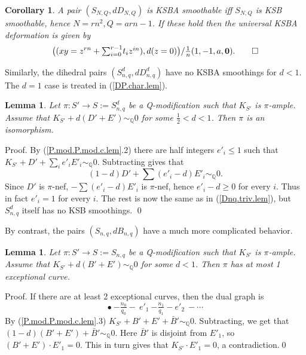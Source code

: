 \documentclass{amsart}
\newtheorem{lem}[thm]{Lemma}
\newtheorem{cor}[thm]{Corollary}
\theoremstyle{definition}
\theoremstyle{remark}
\newcommand{\q}[0]{{\mathbb Q}}
\newcommand{\simq}[0]{\sim_{\q}}
\newcommand{\tsum}[0]{\textstyle{\sum}}
\begin{document}
\begin{cor} \label{34.1.no.defs.thm} A pair 
  $(S_{N,Q}, dD_{N,Q})$ is KSBA smoothable iff $S_{N,Q}$ is KSB smoothable, hence
  $N=rn^2, Q=arn-1$. If these hold then
  the universal KSBA deformation is given by
  $$
  \bigl((xy=z^{rn}+\tsum_{i=0}^{r-1}t_iz^{in}), d(z=0)\bigr)/\tfrac1{n}(1, -1, a, {\mathbf 0}).
  \hfill\qed
  $$
\end{cor}


Similarly, the dihedral pairs $(S^d_{n,q}, dD^d_{n,q})$ have no KSBA smoothings for $d<1$.  The $d=1$ case is treated in (\ref{DP.char.lem}). 

    \begin{lem} \label{Cdnq.triv.lem} Let $\pi:S'\to S:=S^d_{n,q}$ be a Q-modification such that
     $K_{S'}$ is $\pi$-ample. Assume that $K_{S'}+d(D'+E')\simq 0$ for some
     $\frac12< d<1$. Then $\pi$ is an isomorphism.
\end{lem}

     Proof.   By (\ref{P.mod.P.mod.c.lem}.2) there are half integers
     $e'_i\leq 1$ such that  $K_{S'}+D'+\sum_i e'_iE'_i\simq 0$.
     Subtracting gives that
     $$
     (1-d)D'+\tsum (e'_i-d)E'_i\simq 0.
     $$
     Since  $D'$ is $\pi$-nef, $-\tsum (e'_i-d)E'_i$ is $\pi$-nef,
     hence $e'_i-d\geq 0$ for every $i$.   Thus in fact $e'_i=1$ for every $i$.
     The rest is now the same as in (\ref{Dnq.triv.lem}), but $S^d_{n,q}$ itself has no KSB smoothings. \qed






\medskip
By contrast, the pairs  $(S_{n,q}, dB_{n,q})$ have a much more complicated behavior.
   
   \begin{lem} \label{Bnq.almosttriv.lem} Let $\pi:S'\to S:=S_{n,q}$ be a Q-modification such that
     $K_{S'}$ is $\pi$-ample. Assume that $K_{S'}+d(B'+E')\simq 0$ for some
     $ d<1$. Then $\pi$ has at most 1 exceptional curve.
\end{lem}

   Proof.  If there are at least 2 exceptional curves, then 
   the dual graph  is
$$
   \bullet \ {-\boxed{\tfrac{n_0}{q_0}}-} \  e'_1 \  {-\boxed{\tfrac{n_1}{q_1}}-} e'_2 \ - \cdots
   $$
   By (\ref{P.mod.P.mod.c.lem}.3)  $K_{S'}+B'+E'+\bar B'\simq 0$.
   Subtracting, we get that
   $(1-d)(B'+E')+\bar B'\simq 0$.
   Here $\bar B'$ is disjoint from $E'_1$, so
   $(B'+E')\cdot E'_1=0$.  This in turn gives that 
$K_{S'}\cdot E'_1=0$, a contradiction.\qed
\end{document}
